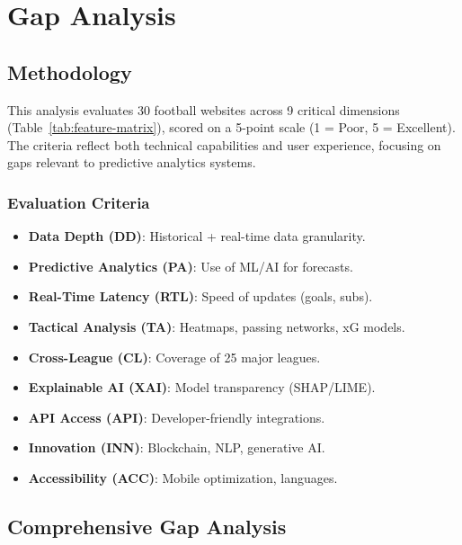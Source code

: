 \chapter{Gap Analysis}
\label{chap:gap-analysis}

\section{Methodology}
This analysis evaluates 30 football websites across 9 critical dimensions (Table~\ref{tab:feature-matrix}), scored on a 5-point scale (1 = Poor, 5 = Excellent). The criteria reflect both technical capabilities and user experience, focusing on gaps relevant to predictive analytics systems.

\subsection{Evaluation Criteria}
\begin{itemize}
    \item \textbf{Data Depth (DD)}: Historical + real-time data granularity.
    \item \textbf{Predictive Analytics (PA)}: Use of ML/AI for forecasts.
    \item \textbf{Real-Time Latency (RTL)}: Speed of updates (goals, subs).
    \item \textbf{Tactical Analysis (TA)}: Heatmaps, passing networks, xG models.
    \item \textbf{Cross-League (CL)}: Coverage of 25 major leagues.
    \item \textbf{Explainable AI (XAI)}: Model transparency (SHAP/LIME).
    \item \textbf{API Access (API)}: Developer-friendly integrations.
    \item \textbf{Innovation (INN)}: Blockchain, NLP, generative AI.
    \item \textbf{Accessibility (ACC)}: Mobile optimization, languages.
\end{itemize}

\section{Comprehensive Gap Analysis}
